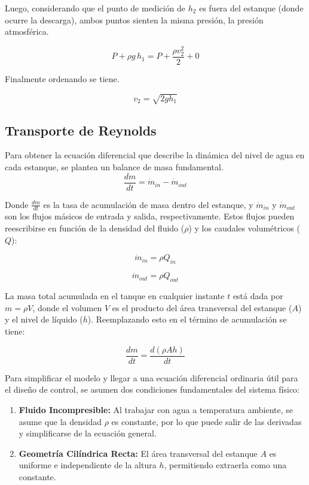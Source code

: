 Luego, considerando que el punto de medición de $h_2$ es fuera del estanque (donde ocurre la descarga), ambos puntos sienten la misma presión, la presión atmosférica.

$$
  P + \rho g \, h_1 = P + \frac{\rho v_2^2}{2} + 0
$$

Finalmente ordenando se tiene.

\begin{equation}
  v_2 = \sqrt{2gh_1}
  \label{Torricelli-final}
\end{equation}
\subsection{Transporte de Reynolds}
Para obtener la ecuación diferencial que describe la dinámica del nivel de agua en cada estanque, se plantea un balance de masa fundamental. 
\begin{equation}
  \frac{dm}{dt} = \dot{m}_{in} - \dot{m}_{out}
  \label{eq:balance-de-masas}
\end{equation}

Donde $\frac{dm}{dt}$ es la tasa de acumulación de masa dentro del estanque, y $\dot{m}_{in}$ y $\dot{m}_{out}$ son los flujos másicos de entrada y salida, respectivamente. Estos flujos pueden reescribirse en función de la densidad del fluido ($\rho$) y los caudales volumétricos ($Q$):

\begin{equation}
  \dot{m}_{in} = \rho Q_{in}
  \label{eq:qin}
\end{equation}

\begin{equation}
  \dot{m}_{out} = \rho Q_{out}
  \label{eq:qout}
\end{equation}

La masa total acumulada en el tanque en cualquier instante $t$ está dada por $m = \rho V$, donde el volumen $V$ es el producto del área transversal del estanque ($A$) y el nivel de líquido ($h$). Reemplazando esto en el término de acumulación se tiene:

\begin{equation}
  \frac{dm}{dt} = \frac{d(\rho A h)}{dt}
  \label{eq:acumulacion}
\end{equation}

Para simplificar el modelo y llegar a una ecuación diferencial ordinaria útil para el diseño de control, se asumen dos condiciones fundamentales del sistema físico:
\begin{enumerate}
    \item \textbf{Fluido Incompresible:} Al trabajar con agua a temperatura ambiente, se asume que la densidad $\rho$ es constante, por lo que puede salir de las derivadas y simplificarse de la ecuación general.
    \item \textbf{Geometría Cilíndrica Recta:} El área transversal del estanque $A$ es uniforme e independiente de la altura $h$, permitiendo extraerla como una constante.
\end{enumerate}

